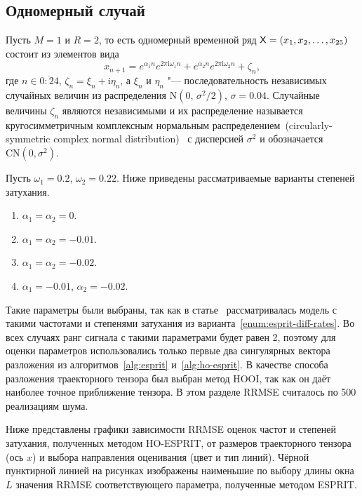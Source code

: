 \documentclass[specialist,
  substylefile=spbu_report.rtx,
subf,href,colorlinks=true, 12pt]{disser}
\theoremstyle{plain}
\theoremstyle{definition}
\theoremstyle{remark}
\newcommand{\iu}{\mathrm{i}}
\begin{document}
\subsection{Одномерный случай}\label{subsec:esprit-comparison}
Пусть $M=1$ и $R=2$, то есть одномерный временной ряд $\mathsf{X} =
\left(x_1, x_2, \ldots, x_{25}\right)$
состоит из элементов вида
\begin{equation}\label{eq:esprit-1d-series}
  x_{n+1} = e^{ \alpha_1 n }
  e^{2 \pi\iu \omega_1 n} +
  e^{ \alpha_2 n }
  e^{ 2 \pi \iu \omega_2 n} + \zeta_n,
\end{equation}
где $n \in \overline{0:24}$, $\zeta_n = \xi_n + \iu \eta_n$, а
$\xi_n$ и $\eta_n$ "--- последовательность независимых случайных величин из
распределения $\mathrm{N}(0,\, \sigma^2 / 2)$, $\sigma=0.04$.
Случайные величины $\zeta_n$ являются независимыми и их
распределение называется кругосимметричным комплексным нормальным
распределением~(circularly-symmetric complex normal
distribution)~\cite{ComplexNormal} с дисперсией
$\sigma^2$ и обозначается
$\mathrm{CN}(0, \sigma^2)$.

Пусть $\omega_1 = 0.2$, $\omega_2 = 0.22$.
Ниже приведены рассматриваемые варианты степеней затухания.
\begin{enumerate}
  \item\label{enum:esprit-no-rates} $\alpha_1=\alpha_2=0$.
  \item\label{enum:esprit-smalleq-rates} $\alpha_1=\alpha_2=-0.01$.
  \item\label{enum:esprit-bigeq-rates} $\alpha_1=\alpha_2=-0.02$.
  \item\label{enum:esprit-diff-rates} $\alpha_1= -0.01$, $\alpha_2=-0.02$.
\end{enumerate}
Такие параметры были выбраны, так как в статье~\cite{hosvd-hooi-separation}
рассматривалась модель с такими частотами и степенями затухания из
варианта~\ref{enum:esprit-diff-rates}.
Во всех случаях ранг сигнала с такими параметрами будет равен 2,
поэтому для оценки параметров
использовались только первые два сингулярных вектора разложения из
алгоритмов~\ref{alg:esprit}
и~\ref{alg:ho-esprit}.
В качестве способа разложения траекторного тензора был выбран
метод HOOI, так как он даёт наиболее точное приближение
тензора.
В этом разделе RRMSE считалось по 500 реализациям шума.

Ниже представлены графики зависимости RRMSE оценок частот и
степеней затухания,
полученных методом HO-ESPRIT, от размеров траекторного тензора
(ось $x$) и выбора направления оценивания (цвет и тип линий).
Чёрной пунктирной линией на рисунках изображены наименьшие по выбору
длины окна $L$ значения RRMSE
соответствующего параметра, полученные методом ESPRIT.
\end{document}
